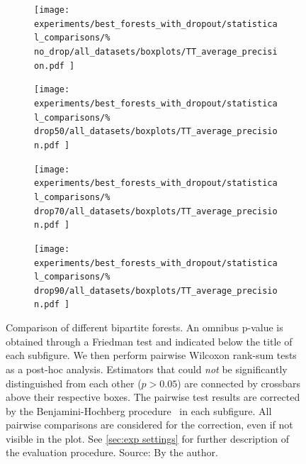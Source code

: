 \begin{figure}[tb]
    \begin{subfigure}{0.24\textwidth}
        \texttt{[image: 
            experiments/best\_forests\_with\_dropout/statistical\_comparisons/\%
            no\_drop/all\_datasets/boxplots/TT\_average\_precision.pdf
        ]}
    \end{subfigure}
    \begin{subfigure}{0.24\textwidth}
        \texttt{[image: 
            experiments/best\_forests\_with\_dropout/statistical\_comparisons/\%
            drop50/all\_datasets/boxplots/TT\_average\_precision.pdf
        ]}
    \end{subfigure}
    \begin{subfigure}{0.24\textwidth}
        \texttt{[image: 
            experiments/best\_forests\_with\_dropout/statistical\_comparisons/\%
            drop70/all\_datasets/boxplots/TT\_average\_precision.pdf
        ]}
    \end{subfigure}
    \begin{subfigure}{0.24\textwidth}
        \texttt{[image: 
            experiments/best\_forests\_with\_dropout/statistical\_comparisons/\%
            drop90/all\_datasets/boxplots/TT\_average\_precision.pdf
        ]}
    \end{subfigure}
    \caption{
        Comparison of different bipartite forests.
        An omnibus p-value is obtained through a Friedman test and indicated below the title of each subfigure.
        We then perform pairwise Wilcoxon rank-sum tests as a post-hoc analysis.
        Estimators that could \emph{not} be significantly distinguished from each other ($p > 0.05$) are connected by crossbars above their respective boxes. 
        The pairwise test results are corrected by the Benjamini-Hochberg procedure~\cite{benjamini1995controlling,haynes2013benjamini} in each subfigure. All pairwise comparisons are considered for the correction, even if not visible in the plot.
        See \autoref{sec:exp settings} for further description of the evaluation procedure. \newline Source: By the author.
    }
    \label{fig:best_forests}
\end{figure}


%     



